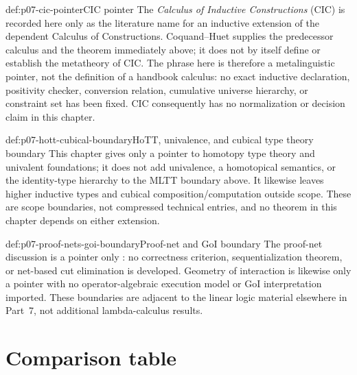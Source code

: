\begin{proofboundary}{def:p07-cic-pointer}{CIC pointer}
The \emph{Calculus of Inductive Constructions} (CIC) is recorded here only as
the literature name for an inductive extension of the dependent Calculus of
Constructions.  Coquand--Huet \cite{CoquandHuet1988} supplies the predecessor
calculus and the theorem immediately above; it does not by itself define or
establish the metatheory of CIC.  The phrase here is therefore a
metalinguistic pointer, not the definition of a handbook calculus: no exact
inductive declaration, positivity checker, conversion relation, cumulative
universe hierarchy, or constraint set has been fixed.  CIC consequently has
no normalization or decision claim in this chapter.
\end{proofboundary}

\begin{proofboundary}{def:p07-hott-cubical-boundary}{HoTT, univalence, and cubical type theory boundary}
This chapter gives only a pointer to homotopy type theory and univalent
foundations; it does not add
univalence, a homotopical semantics, or the identity-type hierarchy to the
MLTT boundary above.  It likewise leaves higher
inductive types and cubical composition/computation outside scope.  These are
scope boundaries, not compressed technical entries, and no theorem in
this chapter depends on either extension.
\end{proofboundary}

\begin{proofboundary}{def:p07-proof-nets-goi-boundary}{Proof-net and GoI boundary}
The proof-net discussion is a pointer only \cite{Girard1987}: no correctness
criterion, sequentialization theorem, or net-based cut elimination is
developed.  Geometry of interaction is likewise only a pointer
with no operator-algebraic execution model or GoI interpretation imported.
These boundaries are adjacent to the linear
logic material elsewhere in Part~7, not additional lambda-calculus results.
\end{proofboundary}

\section{Comparison table}

